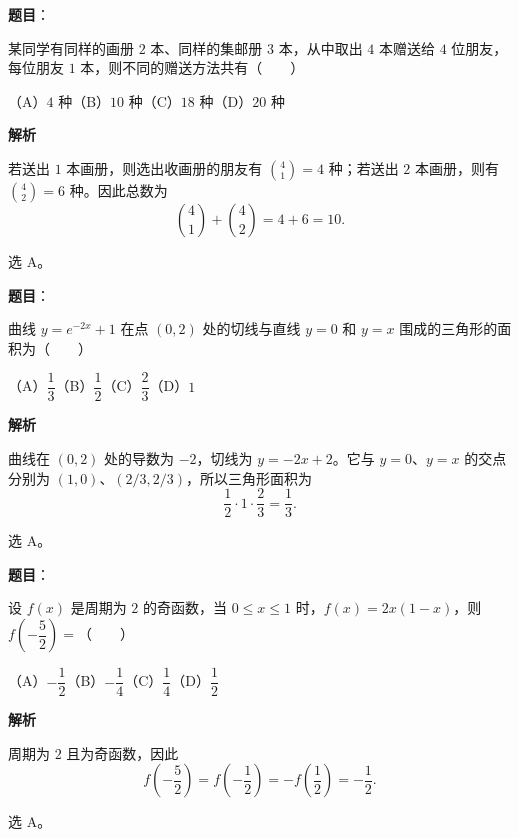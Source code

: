 \begin{answer}

\textbf{题目}：

某同学有同样的画册 $2$ 本、同样的集邮册 $3$ 本，从中取出 $4$ 本赠送给 $4$ 位朋友，每位朋友 $1$ 本，则不同的赠送方法共有\mbox{（　　）}

（A）$4$ 种\quad（B）$10$ 种\quad（C）$18$ 种\quad（D）$20$ 种

\textbf{解析}

若送出 $1$ 本画册，则选出收画册的朋友有
$\binom41=4$ 种；若送出 $2$ 本画册，则有
$\binom42=6$ 种。因此总数为
\nopagebreak[4]
\[
\binom41+\binom42=4+6=10.
\]

选 A。


\end{answer}
\begin{answer}

\textbf{题目}：

曲线 $y=e^{-2x}+1$ 在点 $(0,2)$ 处的切线与直线 $y=0$ 和 $y=x$ 围成的三角形的面积为\mbox{（　　）}

（A）$\dfrac13$\quad（B）$\dfrac12$\quad（C）$\dfrac23$\quad（D）$1$

\textbf{解析}

曲线在 $(0,2)$ 处的导数为 $-2$，切线为
$y=-2x+2$。它与 $y=0$、$y=x$ 的交点分别为
$(1,0)$、$(2/3,2/3)$，所以三角形面积为
\nopagebreak[4]
\[
\frac12\cdot1\cdot\frac23=\frac13.
\]

选 A。


\end{answer}
\begin{answer}

\textbf{题目}：

设 $f(x)$ 是周期为 $2$ 的奇函数，当 $0\leq x\leq1$ 时，$f(x)=2x(1-x)$，则 $f\left(-\dfrac52\right)=$\mbox{（　　）}

（A）$-\dfrac12$\quad（B）$-\dfrac14$\quad（C）$\dfrac14$\quad（D）$\dfrac12$

\textbf{解析}

周期为 $2$ 且为奇函数，因此
\nopagebreak[4]
\[
f\left(-\frac52\right)=f\left(-\frac12\right)
=-f\left(\frac12\right)
=-\frac12.
\]

选 A。


\end{answer}
